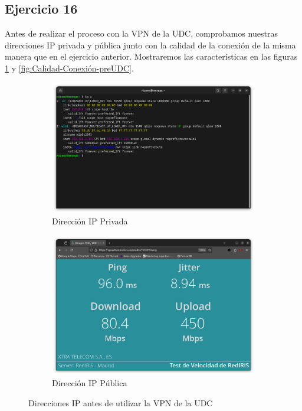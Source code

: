\subsection{Ejercicio 16}
\graphicspath{ {img/16} }


Antes de realizar el proceso con la VPN de la UDC, comprobamos nuestras direcciones IP privada y pública junto con la calidad de la conexión de la misma manera que en el ejercicio anterior. Mostraremos las características en las figuras \ref{fig:IPs-preUDC} y \ref{fig:Calidad-Conexión-preUDC}.

\begin{figure}[H]
    \centering
    \begin{subfigure}{.5\textwidth}
        \centering
        \includegraphics[width=\linewidth]{IP-Privada-UDC.png}
        \caption{Dirección IP Privada}
    \end{subfigure}%
    \begin{subfigure}{.5\textwidth}
        \centering
        \includegraphics[width=\linewidth]{IP-Publica-UDC.png}
        \caption{Dirección IP Pública}
    \end{subfigure}
    \caption{Direcciones IP antes de utilizar la VPN de la UDC}
    \label{fig:IPs-preUDC}
\end{figure}

